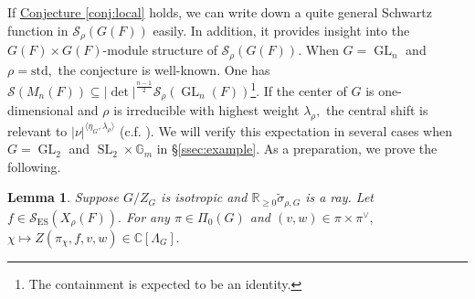 \documentclass[10pt]{amsart}
\newtheorem{lemma}[theorem]{Lemma}
\theoremstyle{definition}
\numberwithin{equation}{section}
\DeclareMathOperator{\GL}{\mathrm{GL}}
\DeclareMathOperator{\SL}{\mathrm{SL}}
\numberwithin{equation}{subsection}
\newcommand{\RR}{\mathbb{R}}
\newcommand{\CC}{\mathbb{C}}
\newcommand{\GG}{\mathbb{G}}
\begin{document}
\noindent 
If \hyperref[conj:local]{Conjecture \ref{conj:local}} holds, we can write down a quite general Schwartz function in $\mathcal{S}_\rho(G(F))$ easily. In addition, it provides insight into the $G(F)\times G(F)$-module structure of $\mathcal{S}_\rho(G(F)).$ When $G=\GL_n$ and $\rho=\mathrm{std},$ the conjecture is well-known. One has $\mathcal{S}(M_{n}(F))\subseteq|\det|^{\frac{n-1}{2}}\mathcal{S}_\rho(\GL_n(F))$\footnote{The containment is expected to be an identity.}. If the center of $G$ is one-dimensional and $\rho$ is irreducible with highest weight $\lambda_\rho,$ the central shift is relevant to $|\nu|^{\langle \eta_G,\lambda_\rho\rangle}$ (c.f. \cite[\S 4.2]{Ngo:Hankel}). We will verify this expectation in several cases when $G=\GL_2$ and $\SL_2\times \GG_m$ in \S \ref{ssec:example}. As a preparation, we prove the following.

\begin{lemma}\label{lem:cuspidalhol}
    Suppose $G/Z_G$ is isotropic and $\RR_{\ge 0}\widetilde{\sigma}_{\rho,G}$ is a ray. Let $f\in \mathcal{S}_{\mathrm{ES}}(X_\rho(F)).$ For any $\pi\in \Pi_0(G)$ and $(v,w)\in\pi\times \pi^\lor,$ $\chi\mapsto Z(\pi_\chi,f,v,w)\in \CC[\Lambda_G].$ 
\end{lemma}
\end{document}
